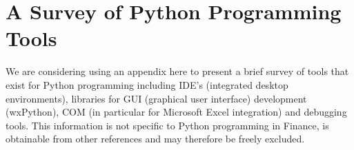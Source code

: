 \section{A Survey of Python Programming Tools} 

We are considering using an appendix here to present a brief survey of
tools that exist for Python programming including IDE's (integrated
desktop environments), libraries for GUI (graphical user interface)
development (wxPython), COM (in particular for Microsoft Excel
integration) and debugging tools. This information is not specific to
Python programming in Finance, is obtainable from other references and
may therefore be freely excluded.
